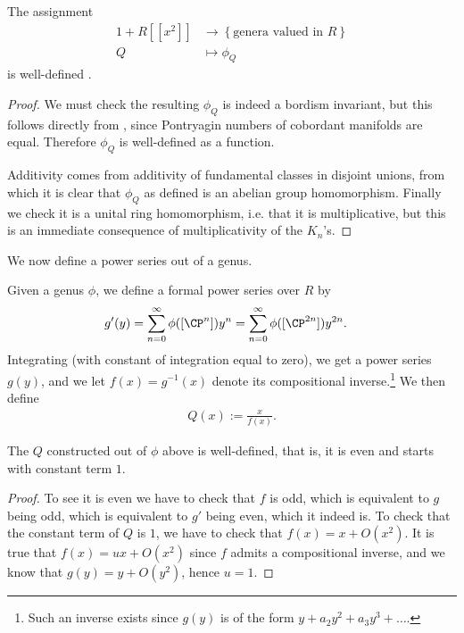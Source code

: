 \documentclass[11pt]{book}
\begin{document}
\begin{proposition}\label{prop:phiQ-well-defined} The assignment
\begin{equation}\label{eqn:Q-to-phiQ}
\begin{aligned}
    1+R[[x^2]] &\to\left\{ \text{genera valued in }R \right\}  \\
    Q &\mapsto \phi_Q
\end{aligned}
\end{equation}
is well-defined \cite[p.~14]{MMF}.
\end{proposition}
\begin{proof} We must check the resulting $\phi_Q$ is indeed a bordism invariant, but this follows directly from , since Pontryagin numbers of cobordant manifolds are equal. Therefore $\phi_Q$ is well-defined as a function.

Additivity comes from additivity of fundamental classes in disjoint unions, from which it is clear that $\phi_Q$ as defined is an abelian group homomorphism. Finally we check it is a unital ring homomorphism, i.e. that it is multiplicative, but this is an immediate consequence of multiplicativity of the $K_n$'s.
\end{proof}

We now define a power series out of a genus.

\begin{construction}\label{constr:power-series-from-genus}
Given a genus $\phi$, we define a formal power series over $R$ by
\begin{align*}
    g'(y) &= \sum_{n=0}^\infty \phi([\CP^n]) y^n = \sum_{n=0}^\infty \phi([\CP^{2n}]) y^{2n}.
\end{align*}
Integrating (with constant of integration equal to zero), we get a power series $g(y)$, and we let $f(x) = g^{-1}(x)$ denote its compositional inverse.\footnote{Such an inverse exists since $g(y)$ is of the form $y + a_2 y^2 + a_3 y^3 +\ldots $.} We then define
\begin{align*}
    Q(x) := \frac{x}{f(x)}.
\end{align*}
\end{construction}

\begin{proposition} The $Q$ constructed out of $\phi$ above is well-defined, that is, it is even and starts with constant term $1$.
\end{proposition}
\begin{proof} To see it is even we have to check that $f$ is odd, which is equivalent to $g$ being odd, which is equivalent to $g'$ being even, which it indeed is. To check that the constant term of $Q$ is $1$, we have to check that $f(x) = x + O(x^2) $. It is true that $f(x) = ux + O(x^2)$ since $f$ admits a compositional inverse, and we know that $g(y) = y + O(y^2)$, hence $u=1$.
\end{proof}
\end{document}
